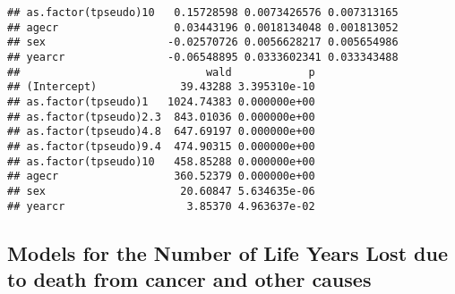 \documentclass[a4paper,11pt]{article}\usepackage[]{graphicx}\usepackage[]{color}
\makeatletter
\newenvironment{kframe}{%
 \def\at@end@of@kframe{}%
 \ifinner\ifhmode%
  \def\at@end@of@kframe{\end{minipage}}%
  \begin{minipage}{\columnwidth}%
 \fi\fi%
 \def\FrameCommand##1{\hskip\@totalleftmargin \hskip-\fboxsep
 \colorbox{shadecolor}{##1}\hskip-\fboxsep
     \hskip-\linewidth \hskip-\@totalleftmargin \hskip\columnwidth}%
 \MakeFramed {\advance\hsize-\width
   \@totalleftmargin\z@ \linewidth\hsize
   \@setminipage}}%
 {\par\unskip\endMakeFramed%
 \at@end@of@kframe}
\newenvironment{knitrout}{}{} %
\makeatother
\begin{document}
\begin{knitrout}
\begin{kframe}
\begin{verbatim}
## as.factor(tpseudo)10   0.15728598 0.0073426576 0.007313165
## agecr                  0.03443196 0.0018134048 0.001813052
## sex                   -0.02570726 0.0056628217 0.005654986
## yearcr                -0.06548895 0.0333602341 0.033343488
##                             wald            p
## (Intercept)             39.43288 3.395310e-10
## as.factor(tpseudo)1   1024.74383 0.000000e+00
## as.factor(tpseudo)2.3  843.01036 0.000000e+00
## as.factor(tpseudo)4.8  647.69197 0.000000e+00
## as.factor(tpseudo)9.4  474.90315 0.000000e+00
## as.factor(tpseudo)10   458.85288 0.000000e+00
## agecr                  360.52379 0.000000e+00
## sex                     20.60847 5.634635e-06
## yearcr                   3.85370 4.963637e-02
\end{verbatim}
\end{kframe}
\end{knitrout}

\subsection{Models for the Number of Life Years Lost due to death from cancer and other causes}
 
\end{document}
